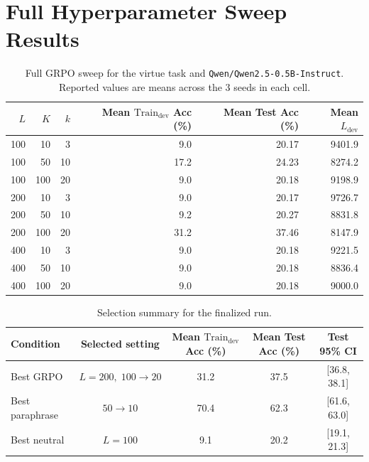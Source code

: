 \documentclass[preprint]{article}
\newcommand{\Ldev}{L_{\text{dev}}}
\newcommand{\Traindev}{\text{Train}_{\text{dev}}}
\begin{document}
\section{Full Hyperparameter Sweep Results}
\label{app:sweep}

\begin{table}[h]
\centering
\caption{Full GRPO sweep for the virtue task and \texttt{Qwen/Qwen2.5-0.5B-Instruct}. Reported values are means across the 3 seeds in each cell.}
\label{tab:full_sweep}
\small
\begin{tabular}{rrrrrr}
\toprule
$L$ & $K$ & $k$ & Mean $\Traindev$ Acc (\%) & Mean Test Acc (\%) & Mean $\Ldev$ \\
\midrule
100 & 10 & 3 & 9.0 & 20.17 & 9401.9 \\
100 & 50 & 10 & 17.2 & 24.23 & 8274.2 \\
100 & 100 & 20 & 9.0 & 20.18 & 9198.9 \\
200 & 10 & 3 & 9.0 & 20.17 & 9726.7 \\
200 & 50 & 10 & 9.2 & 20.27 & 8831.8 \\
200 & 100 & 20 & 31.2 & 37.46 & 8147.9 \\
400 & 10 & 3 & 9.0 & 20.18 & 9221.5 \\
400 & 50 & 10 & 9.0 & 20.18 & 8836.4 \\
400 & 100 & 20 & 9.0 & 20.18 & 9000.0 \\
\bottomrule
\end{tabular}
\end{table}

\begin{table}[h]
\centering
\caption{Selection summary for the finalized run.}
\label{tab:selection_summary}
\small
\begin{tabular}{lcccc}
\toprule
Condition & Selected setting & Mean $\Traindev$ Acc (\%) & Mean Test Acc (\%) & Test 95\% CI \\
\midrule
Best GRPO & $L{=}200,\;100{\to}20$ & 31.2 & 37.5 & [36.8, 38.1] \\
Best paraphrase & $50{\to}10$ & 70.4 & 62.3 & [61.6, 63.0] \\
Best neutral & $L{=}100$ & 9.1 & 20.2 & [19.1, 21.3] \\
\bottomrule
\end{tabular}
\end{table}
\end{document}
